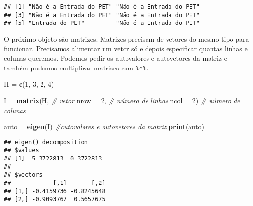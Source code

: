 \documentclass[]{article}
\newenvironment{Shaded}{\begin{snugshade}}{\end{snugshade}}
\newcommand{\CommentTok}[1]{\textcolor[rgb]{0.56,0.35,0.01}{\textit{#1}}}
\newcommand{\DataTypeTok}[1]{\textcolor[rgb]{0.13,0.29,0.53}{#1}}
\newcommand{\DecValTok}[1]{\textcolor[rgb]{0.00,0.00,0.81}{#1}}
\newcommand{\KeywordTok}[1]{\textcolor[rgb]{0.13,0.29,0.53}{\textbf{#1}}}
\newcommand{\NormalTok}[1]{#1}
\newcommand{\OperatorTok}[1]{\textcolor[rgb]{0.81,0.36,0.00}{\textbf{#1}}}
\newcommand{\StringTok}[1]{\textcolor[rgb]{0.31,0.60,0.02}{#1}}
\begin{document}
\begin{verbatim}
## [1] "Não é a Entrada do PET" "Não é a Entrada do PET"
## [3] "Não é a Entrada do PET" "Não é a Entrada do PET"
## [5] "Entrada do PET"         "Não é a Entrada do PET"
\end{verbatim}

O próximo objeto são matrizes. Matrizes precisam de vetores do mesmo
tipo para funcionar. Precisamos alimentar um vetor só e depois
especificar quantas linhas e colunas queremos. Podemos pedir os
autovalores e autovetores da matriz e também podemos multiplicar
matrizes com \texttt{\%*\%}.

\begin{Shaded}
\begin{Highlighting}[]
\NormalTok{H =}\StringTok{ }\KeywordTok{c}\NormalTok{(}\DecValTok{1}\NormalTok{, }\DecValTok{3}\NormalTok{, }\DecValTok{2}\NormalTok{, }\DecValTok{4}\NormalTok{) }

\NormalTok{I =}\StringTok{ }\KeywordTok{matrix}\NormalTok{(H,        }\CommentTok{# vetor}
           \DataTypeTok{nrow =} \DecValTok{2}\NormalTok{, }\CommentTok{# número de linhas}
           \DataTypeTok{ncol =} \DecValTok{2}\NormalTok{) }\CommentTok{# número de colunas}

\NormalTok{auto =}\StringTok{ }\KeywordTok{eigen}\NormalTok{(I) }\CommentTok{#autovalores e autovetores da matriz}
\KeywordTok{print}\NormalTok{(auto)}
\end{Highlighting}
\end{Shaded}

\begin{verbatim}
## eigen() decomposition
## $values
## [1]  5.3722813 -0.3722813
## 
## $vectors
##            [,1]       [,2]
## [1,] -0.4159736 -0.8245648
## [2,] -0.9093767  0.5657675
\end{verbatim}

\begin{Shaded}
\end{Shaded}
\end{document}
